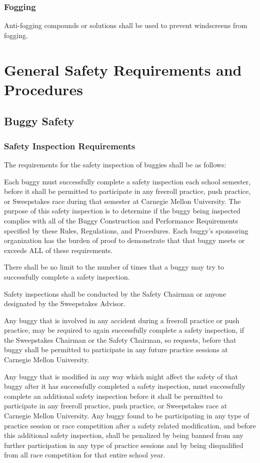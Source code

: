 \documentclass[openany]{book}
\begin{document}
\subsection{Fogging}

Anti-fogging compounds or solutions shall be used to prevent windscreens from fogging.

\chapter{General Safety Requirements and Procedures}

\section{Buggy Safety}

\subsection{Safety Inspection Requirements}

The requirements for the safety inspection of buggies shall be as follows:

Each buggy must successfully complete a safety inspection each school semester, before it shall be permitted to participate in any freeroll practice, push practice, or Sweepstakes race during that semester at Carnegie Mellon University. The purpose of this safety inspection is to determine if the buggy being inspected complies with all of the Buggy Construction and Performance Requirements specified by these Rules, Regulations, and Procedures. Each buggy's sponsoring organization has the burden of proof to demonstrate that that buggy meets or exceeds ALL of these requirements.

There shall be no limit to the number of times that a buggy may try to successfully complete a safety inspection.

Safety inspections shall be conducted by the Safety Chairman or anyone designated by the Sweepstakes Advisor.

Any buggy that is involved in any accident during a freeroll practice or push practice, may be required to again successfully complete a safety inspection, if the Sweepstakes Chairman or the Safety Chairman, so requests, before that buggy shall be permitted to participate in any future practice sessions at Carnegie Mellon University.

Any buggy that is modified in any way which might affect the safety of that buggy after it has successfully completed a safety inspection, must successfully complete an additional safety inspection before it shall be permitted to participate in any freeroll practice, push practice, or Sweepstakes race at Carnegie Mellon University. Any buggy found to be participating in any type of practice session or race competition after a safety related modification, and before this additional safety inspection, shall be penalized by being banned from any further participation in any type of practice sessions and by being disqualified from all race competition for that entire school year.
\end{document}
